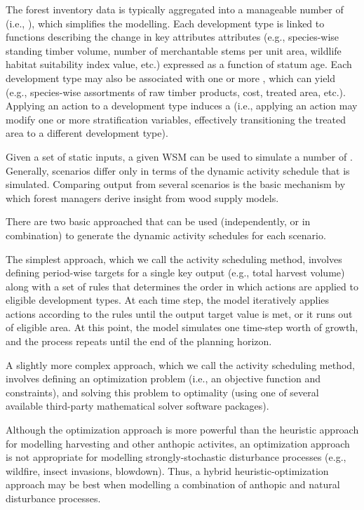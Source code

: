 \documentclass[letterpaper,10pt,english]{sphinxmanual}
\begin{document}
The forest inventory data is typically aggregated into a manageable number of  (i.e., ), which simplifies the modelling.  Each development type is linked to  functions describing the change in key attributes attributes (e.g., species-wise standing timber volume, number of merchantable stems per unit area, wildlife habitat suitability index value, etc.) expressed as a function of statum age. Each development type may also be associated with one or more , which can yield  (e.g., species-wise assortments of raw timber products, cost, treated area, etc.). Applying an action to a development type induces a  (i.e., applying an action may modify one or more stratification variables, effectively transitioning the treated area to a different development type).

Given a set of static inputs, a given WSM can be used to simulate a number of . Generally, scenarios differ only in terms of the dynamic activity schedule that is simulated. Comparing output from several scenarios is the basic mechanism by which forest managers derive insight from wood supply models.

There are two basic approached that can be used (independently, or in combination) to generate the dynamic activity schedules for each scenario.

The simplest approach, which we call the  activity scheduling method, involves defining period-wise targets for a single key output (e.g., total harvest volume) along with a set of rules that determines the order in which actions are applied to eligible development types. At each time step, the model iteratively applies actions according to the rules until the output target value is met, or it runs out of eligible area. At this point, the model simulates one time-step worth of growth, and the process repeats until the end of the planning horizon.

A slightly more complex approach, which we call the  activity scheduling method, involves defining an optimization problem (i.e., an objective function and constraints), and solving this problem to optimality (using one of several available third-party mathematical solver software packages).

Although the optimization approach is more powerful than the heuristic approach for modelling harvesting and other anthopic activites, an optimization approach is not appropriate for modelling strongly-stochastic disturbance processes (e.g., wildfire, insect invasions, blowdown). Thus, a hybrid heuristic-optimization approach may be best when modelling a combination of anthopic and natural disturbance processes.
\end{document}
